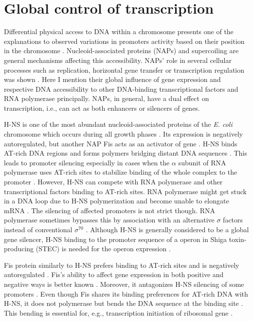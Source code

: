\section{Global control of transcription}
Differential physical access to DNA within a chromosome presents one of the explanations to observed variations in promoters activity based on their position in the chromosome \cite{bryant2014chromosome}.
Nucleoid-associated proteins (NAPs) and supercoiling are general mechanisms affecting this accessibility.
NAPs' role in several cellular processes such as replication, horizontal gene transfer or transcription regulation was shown \cite{dixon1984protein, kayoko1992histone, aznar2013hha}.
Here I mention their global influence of gene expression and respective DNA accessibility to other DNA-binding transcriptional factors and RNA polymerase principally.
NAPs, in general, have a dual effect on transcription, i.e., can act as both enhancers or silencers of genes.

H-NS is one of the most abundant nucleoid-associated proteins of the \textit{E. coli} chromosome which occurs during all growth phases \cite{azam1999growth}.
Its expression is negatively autoregulated, but another NAP Fis acts as an activator of  gene \cite{ueguchi1993autoregulatory, falconi1996antagonistic}.
H-NS binds AT-rich DNA regions and forms polymers bridging distant DNA sequences  \cite{navarre2006selective, arold2010h}.
This leads to promoter silencing especially in cases when the $\alpha$ subunit of RNA polymerase uses AT-rich sites to stabilize binding of the whole complex to the promoter \cite{singh2013h}.
However, H-NS can compete with RNA polymerase and other transcriptional factors binding to AT-rich sites.
RNA polymerase might get stuck in a DNA loop due to H-NS polymerization and become unable to elongate mRNA \cite{dame2002structural}.
The silencing of affected promoters is not strict though.
RNA polymerase sometimes bypasses this by association with an alternative $\sigma$ factors instead of conventional $\sigma^{70}$ \cite{grainger2008selective}.
Although H-NS is generally considered to be a global gene silencer, H-NS binding to the promoter sequence of a  operon in Shiga toxin-producing  (STEC) is needed for the  operon expression \cite{singh2013h}.

Fis protein similarly to H-NS prefers binding to AT-rich sites and is negatively autoregulated \cite{ball1992dramatic, stella2010shape}.
Fis's ability to affect gene expression in both positive and negative ways is better known \cite{choi2005effects, karambelkar2012silencing}.
Moreover, it antagonizes H-NS silencing of some promoters \cite{falconi2001involvement}.
Even though Fis shares its binding preferences for AT-rich DNA with H-NS, it does not polymerase but bends the DNA sequence at the binding site \cite{hubner1989bent}.
This bending is essential for, e.g., transcription initiation of ribosomal gene  \cite{gosink1993dna}.

